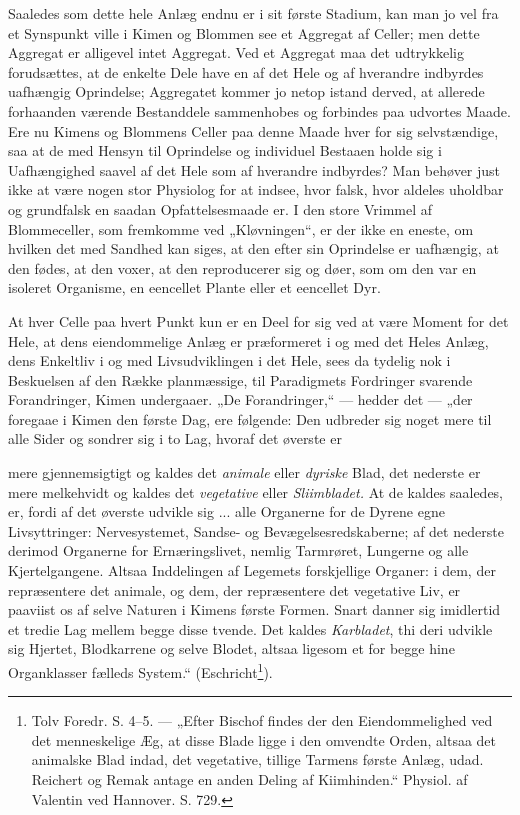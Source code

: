 \documentclass[12pt,a4paper]{book}
\begin{document}
Saaledes som dette hele Anlæg endnu er i sit første Stadium, kan man jo
vel fra et Synspunkt ville i Kimen og Blommen see et Aggregat af Celler;
men dette Aggregat er alligevel intet Aggregat. Ved et Aggregat maa det
udtrykkelig forudsættes, at de enkelte Dele have en af det Hele og af
hverandre indbyrdes uafhængig Oprindelse; Aggregatet kommer jo netop
istand derved, at allerede forhaanden værende Bestanddele sammenhobes og
forbindes paa udvortes Maade. Ere nu Kimens og Blommens Celler paa denne
Maade hver for sig selvstændige, saa at de med Hensyn til Oprindelse og
individuel Bestaaen holde sig i Uafhængighed saavel af det Hele som af
hverandre indbyrdes? Man behøver just ikke at være nogen stor Physiolog
for at indsee, hvor falsk, hvor aldeles uholdbar og grundfalsk en saadan
Opfattelsesmaade er. I den store Vrimmel af Blommeceller, som fremkomme
ved „Kløvningen“, er der ikke en eneste, om hvilken det med Sandhed kan
siges, at den efter sin Oprindelse er uafhængig, at den fødes, at den
voxer, at den reproducerer sig og døer, som om den var en isoleret
Organisme, en eencellet Plante eller et eencellet Dyr.

At hver Celle paa hvert Punkt kun er en Deel for sig ved at være Moment
for det Hele, at dens eiendommelige Anlæg er præformeret i og med det
Heles Anlæg, dens Enkeltliv i og med Livsudviklingen i det Hele, sees da
tydelig nok i Beskuelsen af den Række planmæssige, til Paradigmets
Fordringer svarende Forandringer, Kimen undergaaer. „De Forandringer,“
--- hedder det --- „der foregaae i Kimen den første Dag, ere følgende:
Den udbreder sig noget mere til alle Sider og sondrer sig i to Lag,
hvoraf det øverste er

\setcounter{footnote}{0}
mere gjennemsigtigt og kaldes det \emph{animale} eller \emph{dyriske}
Blad, det nederste er mere melkehvidt og kaldes det \emph{vegetative}
eller \emph{Sliimbladet.} At de kaldes saaledes, er, fordi af det øverste
udvikle sig ... alle Organerne for de Dyrene egne Livsyttringer:
Nervesystemet, Sandse- og Bevægelsesredskaberne; af det nederste derimod
Organerne for Ernæringslivet, nemlig Tarmrøret, Lungerne og alle
Kjertelgangene. Altsaa Inddelingen af Legemets forskjellige Organer: i
dem, der repræsentere det animale, og dem, der repræsentere det vegetative
Liv, er paaviist os af selve Naturen i Kimens første Formen. Snart danner
sig imidlertid et tredie Lag mellem begge disse tvende. Det kaldes
\emph{Karbladet}, thi deri udvikle sig Hjertet, Blodkarrene og selve
Blodet, altsaa ligesom et for begge hine Organklasser fælleds System.“
(Eschricht\footnote{Tolv Foredr. S. 4--5. --- „Efter Bischof findes der
den Eiendommelighed ved det menneskelige Æg, at disse Blade ligge i den
omvendte Orden, altsaa det animalske Blad indad, det vegetative, tillige
Tarmens første Anlæg, udad. Reichert og Remak antage en anden Deling af
Kiimhinden.“ Physiol. af Valentin ved Hannover. S. 729.}).
\end{document}
